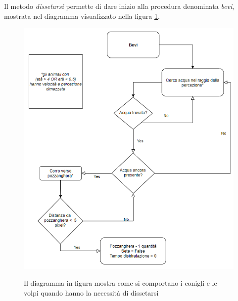 \documentclass[11pt]{article}
\begin{document}
Il metodo \emph{dissetarsi} permette di dare inizio alla procedura denominata \emph{bevi}, mostrata nel diagramma visualizzato nella figura \ref{fig:diagrammaBevi}. 
\begin{figure}
     \centering
     \includegraphics[scale = 0.7]{Sete.png}
     \label{fig:diagrammaBevi}
     \caption{Il diagramma in figura mostra come si comportano i conigli e le volpi quando hanno la necessità di dissetarsi}
\end{figure}
\end{document}
